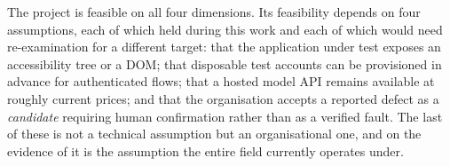 The project is feasible on all four dimensions. Its feasibility depends on four
assumptions, each of which held during this work and each of which would need
re-examination for a different target: that the application under test exposes
an accessibility tree or a DOM; that disposable test accounts can be
provisioned in advance for authenticated flows; that a hosted model API remains
available at roughly current prices; and that the organisation accepts a
reported defect as a
\emph{candidate} requiring human confirmation rather than as a verified fault.
The last of these is not a technical assumption but an organisational one, and
on the evidence of  it is the assumption the entire
field currently operates under.
